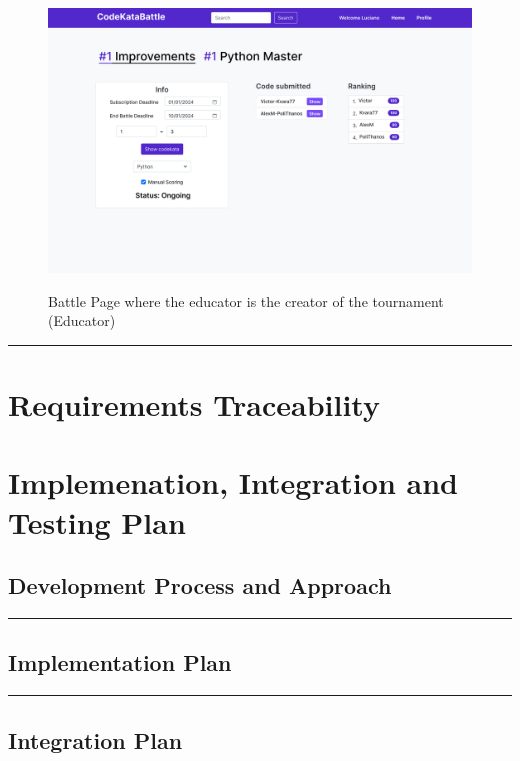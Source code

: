 \documentclass{Configuration_Files/Template}
\begin{document}
\begin{figure}[H]
\centering
\includegraphics[scale = 0.25]{DD_latex/Images/UI/BattlePage_EducatorCreator.png}\\
\caption{Battle Page where the educator is the creator of the tournament (Educator)}
\end{figure}

{\color{bluepoli}\rule{\linewidth}{0.1pt}}

\chapter{Requirements Traceability}

\chapter{Implemenation, Integration and Testing Plan}

\section{Development Process and Approach}

{\color{bluepoli}\rule{\linewidth}{0.1pt}}

\section{Implementation Plan}

{\color{bluepoli}\rule{\linewidth}{0.1pt}}

\section{Integration Plan}
\end{document}
